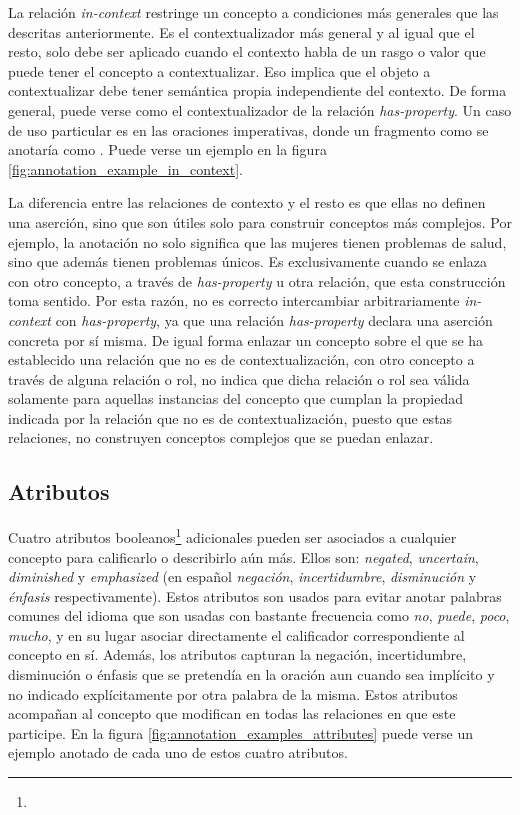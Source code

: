 La relación {\it in-context} restringe un concepto a condiciones más generales que las descritas anteriormente. Es el contextualizador más general y al igual que el resto, solo debe ser aplicado cuando el contexto habla de un rasgo o valor que puede tener el concepto a contextualizar. Eso implica que el objeto a contextualizar debe tener semántica propia independiente del contexto. De forma general, puede verse como el contextualizador de la relación {\it has-property}. Un caso de uso particular es en las oraciones imperativas, donde un fragmento como  se anotaría como . Puede verse un ejemplo en la figura \ref{fig:annotation_example_in_context}.

La diferencia entre las relaciones de contexto y el resto es que ellas no definen una aserción, sino que son útiles solo para construir conceptos más complejos. Por ejemplo, la anotación  no solo significa que las mujeres tienen problemas de salud, sino que además tienen problemas únicos. Es exclusivamente cuando se enlaza con otro concepto, a través de {\it has-property} u otra relación, que esta construcción toma sentido. Por esta razón, no es correcto intercambiar arbitrariamente {\it in-context} con {\it has-property}, ya que una relación {\it has-property} declara una aserción concreta por sí misma. De igual forma enlazar un concepto sobre el que se ha establecido una relación que no es de contextualización, con otro concepto a través de alguna relación o rol, no indica que dicha relación o rol sea válida solamente para aquellas instancias del concepto que cumplan la propiedad indicada por la relación que no es de contextualización, puesto que estas relaciones, no construyen conceptos complejos que se puedan enlazar.

\subsection{Atributos}
Cuatro atributos booleanos\footnote{} adicionales pueden ser asociados a cualquier concepto para calificarlo o describirlo aún más. Ellos son: {\it negated}, {\it uncertain}, {\it diminished} y {\it emphasized} (en español {\it negación}, {\it incertidumbre}, {\it disminución} y {\it énfasis} respectivamente). Estos atributos son usados para evitar anotar palabras comunes del idioma que son usadas con bastante frecuencia como {\it no}, {\it puede}, {\it poco}, {\it mucho}, y en su lugar asociar directamente el calificador correspondiente al concepto en sí. Además, los atributos capturan la negación, incertidumbre, disminución o énfasis que se pretendía en la oración aun cuando sea implícito y no indicado explícitamente por otra palabra de la misma. Estos atributos acompañan al concepto que modifican en todas las relaciones en que este participe. En la figura \ref{fig:annotation_examples_attributes} puede verse un ejemplo anotado de cada uno de estos cuatro atributos.

